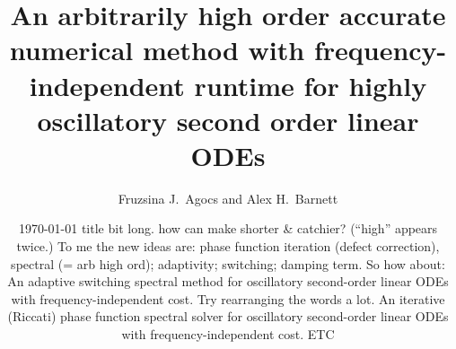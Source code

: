 \documentclass[10pt]{article}
\newcommand{\AB}[1]{{\color{orange}#1}}
\begin{document}
\title{An arbitrarily high order accurate numerical method with
frequency-independent runtime for highly oscillatory second order linear ODEs}


\author{Fruzsina J.\ Agocs and Alex H.\ Barnett}
\date{\today
\AB{title bit long. how can make shorter \& catchier? (``high'' appears twice.)
  To me the new ideas are: phase function iteration (defect correction), spectral (= arb high ord); adaptivity; switching; damping term.
  So how about:
  An adaptive switching spectral method
  for oscillatory second-order linear ODEs with frequency-independent cost.
  Try rearranging the words a lot.
  An iterative (Riccati) phase function spectral solver
  for oscillatory second-order linear ODEs with frequency-independent cost.
  ETC
}  
}
\maketitle
\end{document}
